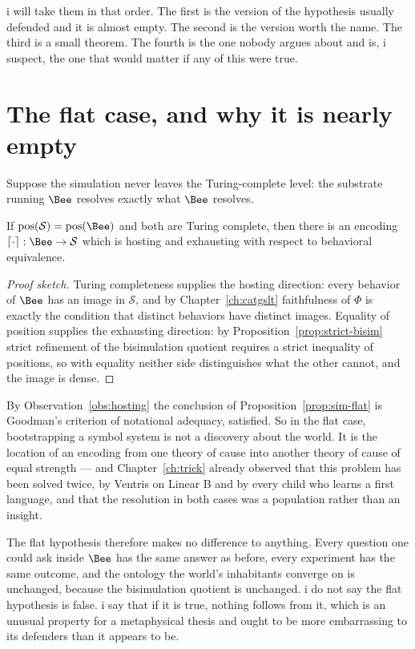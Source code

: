\noindent
i will take them in that order.
The first is the version of the hypothesis usually defended and it is
almost empty.
The second is the version worth the name.
The third is a small theorem.
The fourth is the one nobody argues about and is, i suspect, the one that
would matter if any of this were true.

\section{The flat case, and why it is nearly empty}
\label{sec:sim-flat}

Suppose the simulation never leaves the Turing-complete level: the
substrate running $\Bee$ resolves exactly what $\Bee$ resolves.

\begin{proposition}
\label{prop:sim-flat}
If $\mathrm{pos}(\mathcal{S}) = \mathrm{pos}(\Bee)$ and both are Turing
complete, then there is an encoding
$\lceil \cdot \rceil : \Bee \to \mathcal{S}$ which is hosting and
exhausting with respect to behavioral equivalence.
\end{proposition}

\begin{proof}[Proof sketch]
Turing completeness supplies the hosting direction: every behavior of
$\Bee$ has an image in $\mathcal{S}$, and by
Chapter~\ref{ch:catgslt} faithfulness of $\Phi$ is exactly the condition
that distinct behaviors have distinct images.
Equality of position supplies the exhausting direction: by
Proposition~\ref{prop:strict-bisim} strict refinement of the
bisimulation quotient requires a strict inequality of positions, so with
equality neither side distinguishes what the other cannot, and the image
is dense.
\end{proof}

\begin{remark}
\label{rmk:sim-flat-empty}
By Observation~\ref{obs:hosting} the conclusion of
Proposition~\ref{prop:sim-flat} is Goodman's criterion of notational
adequacy, satisfied.
So in the flat case, bootstrapping a symbol system is not a discovery
about the world.
It is the location of an encoding from one theory of cause into another
theory of cause of equal strength --- and Chapter~\ref{ch:trick} already
observed that this problem has been solved twice, by Ventris on Linear B
and by every child who learns a first language, and that the resolution
in both cases was a population rather than an insight.

The flat hypothesis therefore makes no difference to anything.
Every question one could ask inside $\Bee$ has the same answer as before,
every experiment has the same outcome, and the ontology the world's
inhabitants converge on is unchanged, because the bisimulation quotient
is unchanged.
i do not say the flat hypothesis is false.
i say that if it is true, nothing follows from it, which is an unusual
property for a metaphysical thesis and ought to be more embarrassing to
its defenders than it appears to be.
\end{remark}


